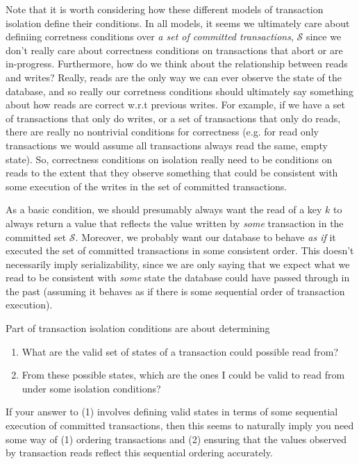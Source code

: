 \documentclass[10pt,a4paper]{article}
\begin{document}
Note that it is worth considering how these different models of transaction isolation define their conditions. In all models, it seems we ultimately care about definiing corretness conditions over \textit{a set of committed transactions}, $\mathcal{S}$ since we don't really care about correctness conditions on transactions that abort or are in-progress. Furthermore, how do we think about the relationship between reads and writes? Really, reads are the only way we can ever observe the state of the database, and so really our corretness conditions should ultimately say something about how reads are correct w.r.t previous writes. For example, if we have a set of transactions that only do writes, or a set of transactions that only do reads, there are really no nontrivial conditions for correctness (e.g. for read only transactions we would assume all transactions always read the same, empty state). So, correctness conditions on isolation really need to be conditions on reads to the extent that they observe something that could be consistent with some execution of the writes in the set of committed transactions. 

As a basic condition, we should presumably always want the read of a key $k$ to always return a value that reflects the value written by \textit{some} transaction in the committed set $\mathcal{S}$. Moreover, we probably want our database to behave \textit{as if} it executed the set of committed transactions in some consistent order. This doesn't necessarily imply serializability, since we are only saying that we expect what we read to be consistent with \textit{some} state the database could have passed through in the past (assuming it behaves as if there is some sequential order of transaction execution).


Part of transaction isolation conditions are about determining 
\begin{enumerate}
    \item What are the valid set of states of a transaction could possible read from?
    \item From these possible states, which are the ones I could be valid to read from under some isolation conditions?
\end{enumerate}
If your answer to (1) involves defining valid states in terms of some sequential execution of committed transactions, then this seems to naturally imply you need some way of (1) ordering transactions and (2) ensuring that the values observed by transaction reads reflect this sequential ordering accurately.
\end{document}
